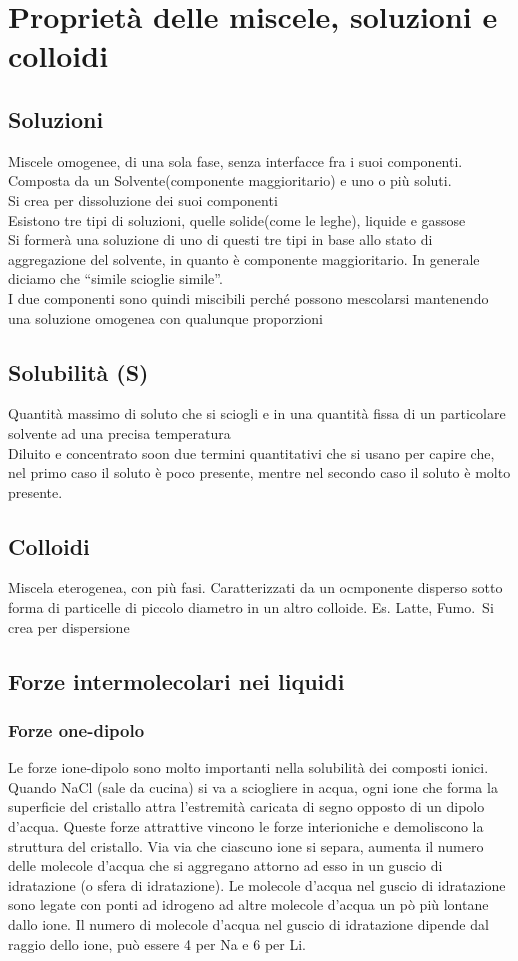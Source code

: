 \section{Proprietà delle miscele, soluzioni e colloidi}
\subsection{Soluzioni}
Miscele omogenee, di una sola fase, senza interfacce fra i suoi componenti.\\
Composta da un Solvente(componente maggioritario) e uno o più soluti.\\
Si crea per dissoluzione dei suoi componenti\\
Esistono tre tipi di soluzioni, quelle solide(come le leghe), liquide e gassose\\
Si formerà una soluzione di uno di questi tre tipi in base allo stato di aggregazione del solvente, in quanto è componente maggioritario. In generale diciamo che “simile scioglie simile”.\\
I due componenti sono quindi miscibili perché possono mescolarsi mantenendo una soluzione omogenea con qualunque proporzioni
\subsection{Solubilità (S)}
Quantità massimo di soluto che si sciogli e in una quantità fissa di un particolare solvente ad una precisa temperatura\\
Diluito e concentrato soon due termini quantitativi che si usano per capire che, nel primo caso il soluto è poco presente, mentre nel secondo caso il soluto è molto presente.
\subsection{Colloidi}
Miscela eterogenea, con più fasi. Caratterizzati da un ocmponente disperso sotto forma di particelle di piccolo diametro in un altro colloide. Es. Latte, Fumo.\
Si crea per dispersione
\subsection{Forze intermolecolari nei liquidi}
\subsubsection{Forze one-dipolo}
Le forze ione-dipolo sono molto importanti nella solubilità dei composti ionici.\\
Quando NaCl (sale da cucina) si va a sciogliere in acqua, ogni ione che forma la superficie del cristallo attra l’estremità caricata di segno opposto di un dipolo d’acqua. Queste forze attrattive vincono le forze interioniche e demoliscono la struttura del cristallo. Via via che ciascuno ione si separa, aumenta il numero delle molecole d’acqua che si aggregano attorno ad esso in un guscio di idratazione (o sfera di idratazione). Le molecole d’acqua nel guscio di idratazione sono legate con ponti ad idrogeno ad altre molecole d’acqua un pò più lontane dallo ione. Il numero di molecole d’acqua nel guscio di idratazione dipende dal raggio dello ione, può essere 4 per Na e 6 per Li. 
